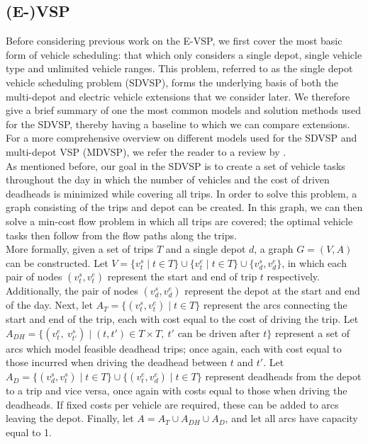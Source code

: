 \documentclass[]{article}
\begin{document}
\subsection{(E-)VSP}
Before considering previous work on the E-VSP, we first cover the most basic form of vehicle scheduling: that which only considers a single depot, single vehicle type and unlimited vehicle ranges. This problem, referred to as the single depot vehicle scheduling problem (SDVSP), forms the underlying basis of both the multi-depot and electric vehicle extensions that we consider later. We therefore give a brief summary of one the most common models and solution methods used for the SDVSP, thereby having a baseline to which we can compare extensions. For a more comprehensive overview on different models used for the SDVSP and multi-depot VSP (MDVSP), we refer the reader to a review by \citet{Bunte2009}. \\
As mentioned before, our goal in the SDVSP is to create a set of vehicle tasks throughout the day in which the number of vehicles and the cost of driven deadheads is minimized while covering all trips. In order to solve this problem, a graph consisting of the trips and depot can be created. In this graph, we can then solve a min-cost flow problem in which all trips are covered; the optimal vehicle tasks then follow from the flow paths along the trips. \\
More formally, given a set of trips $T$ and a single depot $d$, a graph $G = (V, A)$ can be constructed. Let $V = \{ v^s_t \mid t \in T \} \cup \{ v^e_t \mid t \in T \} \cup \{ v^s_d, v^e_d \}$, in which each pair of nodes $(v^s_t, v^e_t)$ represent the start and end of trip $t$ respectively. Additionally, the pair of nodes $(v^s_d, v^e_d)$ represent the depot at the start and end of the day. Next, let $A_T = \{ (v^s_t, v^e_t) \mid t \in T \}$ represent the arcs connecting the start and end of the trip, each with cost equal to the cost of driving the trip. Let $A_{DH} = \{ ( v^e_t,\: v^s_{t'}) \mid (t, t') \in T \times T,\: t'\text{ can be driven after }t \}$ represent a set of arcs which model feasible deadhead trips; once again, each with cost equal to those incurred when driving the deadhead between $t$ and $t'$. Let $A_{D} = \{ (v^s_d, v^s_t) \mid t \in T \} \cup \{ (v^e_t, v_d^e) \mid t \in T \}$ represent deadheads from the depot to a trip and vice versa, once again with costs equal to those when driving the deadheads. If fixed costs per vehicle are required, these can be added to arcs leaving the depot. Finally, let $A = A_T \cup A_{DH} \cup A_D$, and let all arcs have capacity equal to 1. \\
\end{document}
